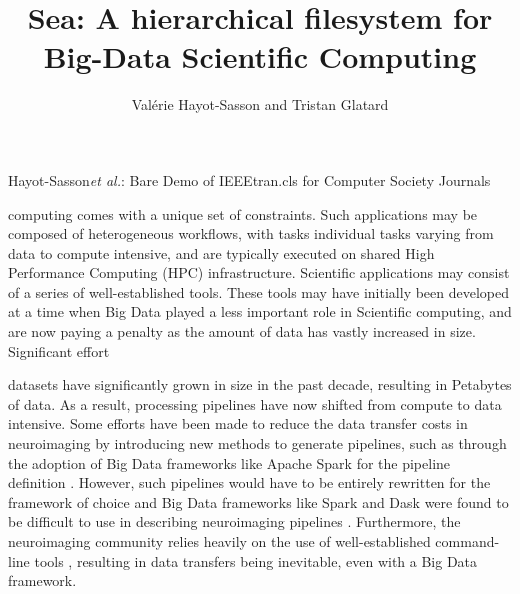 \documentclass[10pt,journal,compsoc]{IEEEtran}
\begin{document}
\title{Sea: A hierarchical filesystem for Big-Data Scientific Computing}

\author{Val\'erie Hayot-Sasson and Tristan Glatard}

%
{Hayot-Sasson\MakeLowercase{\textit{et al.}}: Bare Demo of IEEEtran.cls for Computer Society Journals}
\IEEEtitleabstractindextext{%
\begin{abstract}
\end{abstract}
}


\maketitle


\IEEEdisplaynontitleabstractindextext
\IEEEpeerreviewmaketitle



 computing comes with a unique set of constraints. Such
applications may be composed of heterogeneous workflows, with tasks individual tasks
varying from data to compute intensive, and are typically executed on
shared High Performance Computing (HPC) infrastructure. Scientific applications may consist
of a series of well-established tools. These tools may have initially been developed at
a time when Big Data played a less important role in Scientific computing, and are now
paying a penalty as the amount of data has vastly increased in size. Significant effort



datasets have significantly grown in size in the past decade,
resulting in Petabytes of data. As a result, processing pipelines have now shifted from compute to 
data intensive. Some efforts have been made to reduce the data transfer costs in neuroimaging by
introducing new methods to generate pipelines, such as through the adoption of Big Data frameworks
like Apache Spark \cite{Spark} for the pipeline definition \cite{thunder} \cite{other papers}. 
However, such pipelines would have to be entirely rewritten for the framework of choice and Big Data
frameworks like Spark and Dask were found to be difficult to use in describing neuroimaging pipelines \cite{mehta}.
Furthermore, the neuroimaging community relies heavily on the use of well-established command-line tools \cite{fsl, afni, freesurfer}, resulting in
data transfers being inevitable, even with a Big Data framework. 
\end{document}
